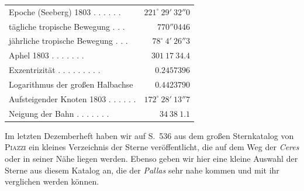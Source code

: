 \begin{center}
\begingroup\fontsize{9}{11}\selectfont\setlength{\tabcolsep}{3pt}
\begin{tabular}{lr}
Epoche (Seeberg) 1803 . . . . . . & $221^\circ\ 29'\ 32''0$ \\
tägliche tropische Bewegung . . . & $770''0446$ \\
jährliche tropische Bewegung . . . & $78^\circ\ 4'\ 26''3$ \\
Aphel 1803 . . . . . . . & $301\ 17\ 34.4$ \\
Exzentrizität . . . . . . . . . & $0.2457396$ \\
Logarithmus der großen Halbachse  & $0.4423790$ \\
Aufsteigender Knoten 1803 . . . . . . & $172^\circ\ 28'\ 13''7$ \\
Neigung der Bahn . . . . . . . & $34\ 38\ 1.1$ \\
\end{tabular}\endgroup
\end{center}
%

Im letzten Dezemberheft haben wir auf S.\ 536 aus dem großen Sternkatalog von \textsc{Piazzi} ein kleines Verzeichnis der Sterne veröffentlicht, die auf dem Weg der \emph{Ceres} oder in seiner Nähe liegen werden. Ebenso geben wir hier eine kleine Auswahl der Sterne aus diesem Katalog an, die der \emph{Pallas} sehr nahe kommen und mit ihr verglichen werden können.

\begin{flushright}
\end{flushright}

\bigskip
